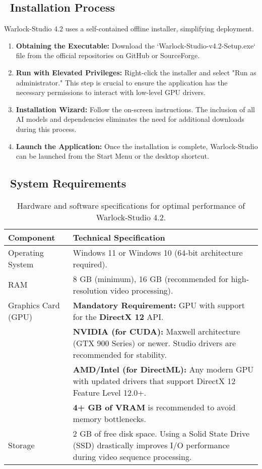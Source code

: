 \documentclass[11pt, a4paper]{article}
\begin{document}
\subsection{\faDownload\ Installation Process}
Warlock-Studio 4.2 uses a self-contained offline installer, simplifying deployment.
\begin{enumerate}[leftmargin=*]
    \item \textbf{Obtaining the Executable:} Download the `Warlock-Studio-v4.2-Setup.exe` file from the official repositories on GitHub or SourceForge.
    \item \textbf{Run with Elevated Privileges:} Right-click the installer and select "Run as administrator." This step is crucial to ensure the application has the necessary permissions to interact with low-level GPU drivers.
    \item \textbf{Installation Wizard:} Follow the on-screen instructions. The inclusion of all AI models and dependencies eliminates the need for additional downloads during this process.
    \item \textbf{Launch the Application:} Once the installation is complete, Warlock-Studio can be launched from the Start Menu or the desktop shortcut.
\end{enumerate}

\subsection{\faMicrochip\ System Requirements}
\begin{table}[H]
    \centering
    \begin{tabularx}{\textwidth}{lX}
        \toprule
        \textbf{Component} & \textbf{Technical Specification} \\
        \midrule
        Operating System & Windows 11 or Windows 10 (64-bit architecture required). \\
        RAM & 8 GB (minimum), 16 GB (recommended for high-resolution video processing). \\
        Graphics Card (GPU) & \textbf{Mandatory Requirement:} GPU with support for the \textbf{DirectX 12} API. \\
        & \textbf{NVIDIA (for CUDA):} Maxwell architecture (GTX 900 Series) or newer. Studio drivers are recommended for stability. \\
        & \textbf{AMD/Intel (for DirectML):} Any modern GPU with updated drivers that support DirectX 12 Feature Level 12.0+. \\
        & \textbf{4+ GB of VRAM} is recommended to avoid memory bottlenecks. \\
        Storage & 2 GB of free disk space. Using a Solid State Drive (SSD) drastically improves I/O performance during video sequence processing. \\
        \bottomrule
    \end{tabularx}
    \caption{Hardware and software specifications for optimal performance of Warlock-Studio 4.2.}
\end{table}
\end{document}
